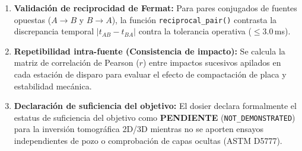 \documentclass[11pt,a4paper]{article}
\begin{document}
\begin{enumerate}
\begin{equation}
\begin{cases}
            \frac{x}{V_1}, & x < x_c \\
            \tau_2 + \frac{x}{V_2}, & x \ge x_c
        \end{cases}
    \end{equation}
    donde $x_c$ es la distancia de cruce y el espesor aparente del primer estrato es:
    \begin{equation}
        z_{\text{aparente}} = \frac{x_c}{2} \sqrt{\frac{V_2 - V_1}{V_2 + V_1}}
    \end{equation}
    \item \textbf{Validación de reciprocidad de Fermat:}
    Para pares conjugados de fuentes opuestas ($A \to B$ y $B \to A$), la función \texttt{reciprocal\_pair()} contrasta la discrepancia temporal $|t_{AB} - t_{BA}|$ contra la tolerancia operativa ($\le 3.0$\,ms).
    \item \textbf{Repetibilidad intra-fuente (Consistencia de impacto):}
    Se calcula la matriz de correlación de Pearson ($r$) entre impactos sucesivos apilados en cada estación de disparo para evaluar el efecto de compactación de placa y estabilidad mecánica.
    \item \textbf{Declaración de suficiencia del objetivo:}
    El dosier declara formalmente el estatus de suficiencia del objetivo como \textbf{PENDIENTE} (\texttt{NOT\_DEMONSTRATED}) para la inversión tomográfica 2D/3D mientras no se aporten ensayos independientes de pozo o comprobación de capas ocultas (ASTM D5777).
\end{enumerate}
\end{document}
